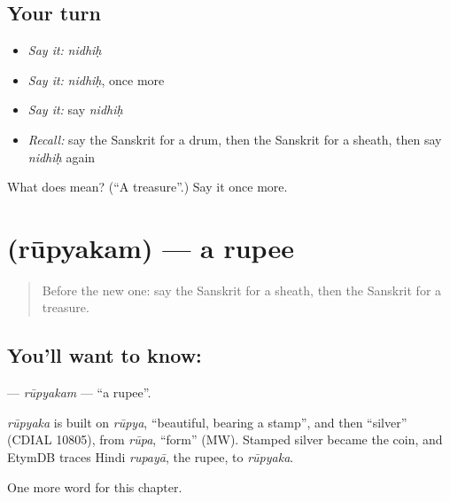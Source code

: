 \subsection*{Your turn}
\begin{itemize}
\raggedright
  \item \emph{Say it:} \emph{nidhiḥ}
  \item \emph{Say it:} \emph{nidhiḥ}, once more
  \item \emph{Say it:} say \emph{nidhiḥ}
  \item \emph{Recall:} say the Sanskrit for a drum, then the Sanskrit for a sheath, then say \emph{nidhiḥ} again
\end{itemize}

\begin{tcolorbox}[breakable,colback=teal!4,colframe=teal!35!black,title={Before you move on}]
What does  mean? (\textquotedblleft{}A treasure\textquotedblright{}.) Say it once more.
\end{tcolorbox}
\section[\texorpdfstring{\sk{रूप्यकम्} (rūpyakam)}{रूप्यकम् (rūpyakam)}]{ (rūpyakam) — a rupee}

\label{lesson:SA-C248-rupyakam}



\begin{quote}
Before the new one: say the Sanskrit for a sheath, then the Sanskrit for a treasure.
\end{quote}

\subsection*{You'll want to know: }
\textbf{} — \emph{rūpyakam} — \textquotedblleft{}a rupee\textquotedblright{}.

\begin{cousinweb}
\emph{rūpyaka} is built on \emph{rūpya}, \textquotedblleft{}beautiful, bearing a stamp\textquotedblright{}, and then \textquotedblleft{}silver\textquotedblright{} (CDIAL 10805), from \emph{rūpa}, \textquotedblleft{}form\textquotedblright{} (MW). Stamped silver became the coin, and EtymDB traces Hindi \emph{rupayā}, the rupee, to \emph{rūpyaka}.
\end{cousinweb}

\begin{grammarlens}[title={What you've built}]
One more word for this chapter.
\end{grammarlens}

